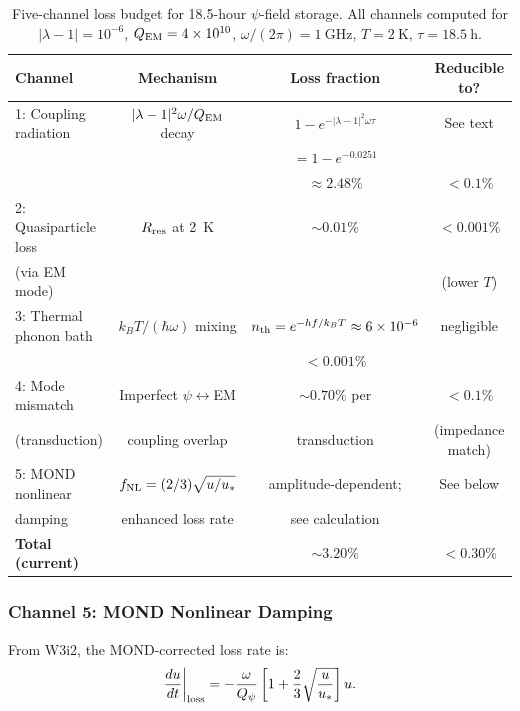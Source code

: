 \documentclass[aps,prd,twocolumn,superscriptaddress]{revtex4-2}
\newcommand{\Qpsi}{Q_\psi}
\newcommand{\lam}{|\lambda-1|}
\begin{document}
\begin{table}[h]
\caption{Five-channel loss budget for 18.5-hour $\psi$-field storage.
All channels computed for $\lam = 10^{-6}$, $Q_{\rm EM} = 4\times 10^{10}$,
$\omega/(2\pi) = 1~\mathrm{GHz}$, $T = 2~\mathrm{K}$, $\tau = 18.5~\mathrm{h}$.}
\label{tab:loss}
\begin{ruledtabular}
\begin{tabular}{lccc}
Channel & Mechanism & Loss fraction & Reducible to? \\
\hline
1: Coupling radiation & $\lam^2\omega/Q_{\rm EM}$ decay &
$1 - e^{-\lam^2\omega\tau}$ & See text \\
& & $= 1 - e^{-0.0251}$ & \\
& & $\approx 2.48\%$ & $< 0.1\%$ \\
\hline
2: Quasiparticle loss & $R_{\rm res}$ at 2~K &
$\sim 0.01\%$ & $< 0.001\%$ \\
(via EM mode) & & & (lower $T$) \\
\hline
3: Thermal phonon bath & $k_B T/(\hbar\omega)$ mixing &
$n_{\rm th} = e^{-hf/k_BT} \approx 6\times 10^{-6}$ &
negligible \\
& & $< 0.001\%$ & \\
\hline
4: Mode mismatch & Imperfect $\psi\leftrightarrow$EM & $\sim 0.70\%$ per & $< 0.1\%$ \\
(transduction) & coupling overlap & transduction & (impedance match) \\
\hline
5: MOND nonlinear & $f_{\rm NL} = (2/3)\sqrt{u/u_*}$ & amplitude-dependent; & See below \\
damping & enhanced loss rate & see calculation & \\
\hline
\textbf{Total (current)} & & \textbf{$\sim 3.20\%$} & \textbf{$< 0.30\%$} \\
\end{tabular}
\end{ruledtabular}
\end{table}

\subsubsection{Channel 5: MOND Nonlinear Damping}

From W3i2, the MOND-corrected loss rate is:
\begin{equation}
\frac{du}{dt}\bigg|_{\rm loss}
= -\frac{\omega}{\Qpsi}\left[1 + \frac{2}{3}\sqrt{\frac{u}{u_*}}\right]u.
\end{equation}
\end{document}
